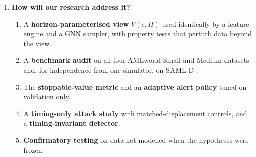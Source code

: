 \documentclass[11pt,a4paper]{article}
\begin{document}
\begin{enumerate}[leftmargin=*]
    \item \textbf{How will our research address it?}
    \begin{enumerate}[leftmargin=*]
        \item A \textbf{horizon-parameterised view} $V(e,H)$ used identically by a feature engine and a GNN sampler, with property tests that perturb data beyond the view.
        \item A \textbf{benchmark audit} on all four AMLworld Small and Medium datasets and, for independence from one simulator, on SAML-D \cite{oztas2023samld}.
        \item The \textbf{stoppable-value metric} and an \textbf{adaptive alert policy} tuned on validation only.
        \item A \textbf{timing-only attack study} with matched-displacement controls, and a \textbf{timing-invariant detector}.
        \item \textbf{Confirmatory testing} on data not modelled when the hypotheses were frozen.
    \end{enumerate}
\end{enumerate}
\end{document}
